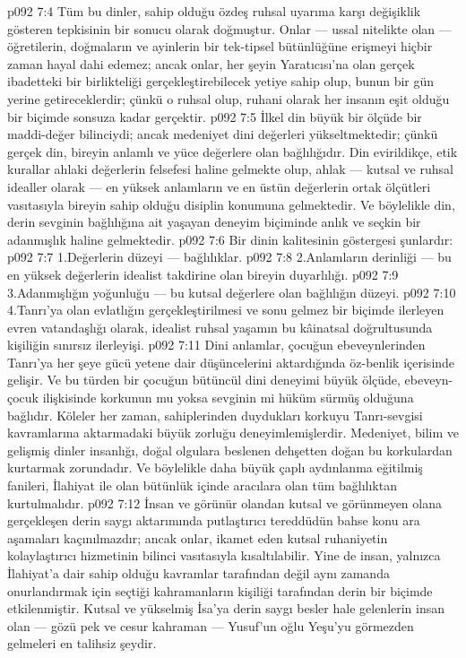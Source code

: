 \vs p092 7:4 Tüm bu dinler, sahip olduğu özdeş ruhsal uyarıma karşı değişiklik gösteren tepkisinin bir sonucu olarak doğmuştur. Onlar --- ussal nitelikte olan --- öğretilerin, doğmaların ve ayinlerin bir tek\hyp{}tipsel bütünlüğüne erişmeyi hiçbir zaman hayal dahi edemez; ancak onlar, her şeyin Yaratıcısı’na olan gerçek ibadetteki bir birlikteliği gerçekleştirebilecek yetiye sahip olup, bunun bir gün yerine getireceklerdir; çünkü o ruhsal olup, ruhani olarak her insanın eşit olduğu bir biçimde sonsuza kadar gerçektir.
\vs p092 7:5 İlkel din büyük bir ölçüde bir maddi\hyp{}değer bilinciydi; ancak medeniyet dini değerleri yükseltmektedir; çünkü gerçek din, bireyin anlamlı ve yüce değerlere olan bağlılığıdır. Din evirildikçe, etik kurallar ahlaki değerlerin felsefesi haline gelmekte olup, ahlak --- kutsal ve ruhsal idealler olarak --- en yüksek anlamların ve en üstün değerlerin ortak ölçütleri vasıtasıyla bireyin sahip olduğu disiplin konumuna gelmektedir. Ve böylelikle din, derin sevginin bağlılığına ait yaşayan deneyim biçiminde anlık ve seçkin bir adanmışlık haline gelmektedir.
\vs p092 7:6 Bir dinin kalitesinin göstergesi şunlardır:
\vs p092 7:7 1.\bibnobreakspace Değerlerin düzeyi --- bağlılıklar.
\vs p092 7:8 2.\bibnobreakspace Anlamların derinliği --- bu en yüksek değerlerin idealist takdirine olan bireyin duyarlılığı.
\vs p092 7:9 3.\bibnobreakspace Adanmışlığın yoğunluğu --- bu kutsal değerlere olan bağlılığın düzeyi.
\vs p092 7:10 4.\bibnobreakspace Tanrı’ya olan evlatlığın gerçekleştirilmesi ve sonu gelmez bir biçimde ilerleyen evren vatandaşlığı olarak, idealist ruhsal yaşamın bu kâinatsal doğrultusunda kişiliğin sınırsız ilerleyişi.
\vs p092 7:11 Dini anlamlar, çocuğun ebeveynlerinden Tanrı’ya her şeye gücü yetene dair düşüncelerini aktardığında öz\hyp{}benlik içerisinde gelişir. Ve bu türden bir çocuğun bütüncül dini deneyimi büyük ölçüde, ebeveyn\hyp{}çocuk ilişkisinde korkunun mu yoksa sevginin mi hüküm sürmüş olduğuna bağlıdır. Köleler her zaman, sahiplerinden duydukları korkuyu Tanrı\hyp{}sevgisi kavramlarına aktarmadaki büyük zorluğu deneyimlemişlerdir. Medeniyet, bilim ve gelişmiş dinler insanlığı, doğal olgulara beslenen dehşetten doğan bu korkulardan kurtarmak zorundadır. Ve böylelikle daha büyük çaplı aydınlanma eğitilmiş fanileri, İlahiyat ile olan bütünlük içinde aracılara olan tüm bağlılıktan kurtulmalıdır.
\vs p092 7:12 İnsan ve görünür olandan kutsal ve görünmeyen olana gerçekleşen derin saygı aktarımında putlaştırıcı tereddüdün bahse konu ara aşamaları kaçınılmazdır; ancak onlar, ikamet eden kutsal ruhaniyetin kolaylaştırıcı hizmetinin bilinci vasıtasıyla kısaltılabilir. Yine de insan, yalnızca İlahiyat’a dair sahip olduğu kavramlar tarafından değil aynı zamanda onurlandırmak için seçtiği kahramanların kişiliği tarafından derin bir biçimde etkilenmiştir. Kutsal ve yükselmiş İsa’ya derin saygı besler hale gelenlerin insan olan --- gözü pek ve cesur kahraman --- Yusuf’un oğlu Yeşu’yu görmezden gelmeleri en talihsiz şeydir.
